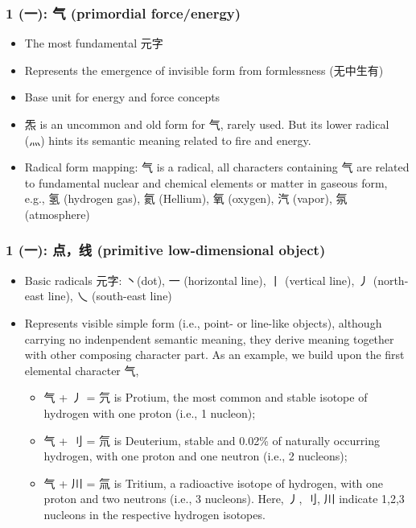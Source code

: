 \documentclass[11pt,letterpaper]{article}
\begin{document}
\subsubsection{1 (一): 气 (primordial force/energy)} 

  \begin{itemize}
  \tightlist
  \item
    The most fundamental 元字
  \item
    Represents the emergence of invisible form from formlessness
    (无中生有)
  \item
    Base unit for energy and force concepts
  \item
    炁 is an uncommon and old form for 气, rarely used. But its lower
    radical (灬) hints its semantic meaning related to fire and energy.
  \item
    Radical form mapping: 气 is a radical, all characters containing 气
    are related to fundamental nuclear and chemical elements or matter
    in gaseous form, e.g., 氢 (hydrogen gas), 氦 (Hellium), 氧 (oxygen),
    汽 (vapor), 氛 (atmosphere)
  \end{itemize}

\subsubsection{1 (一): 点，线 (primitive low-dimensional object)} 
  

  \begin{itemize}
  \tightlist
  \item
    Basic radicals 元字: 丶(dot), 一 (horizontal line), 丨 (vertical
    line), 丿 (north-east line), 乀 (south-east line)
  \item
    Represents visible simple form (i.e., point- or line-like objects),
    although carrying no indenpendent semantic meaning, they derive
    meaning together with other composing character part. As an example,
    we build upon the first elemental character 气,

    \begin{itemize}
    \tightlist
    \item
      气 + 丿 = 氕 is Protium, the most common and stable isotope of
      hydrogen with one proton (i.e., 1 nucleon);
    \item
      气 + 刂 = 氘 is Deuterium, stable and 0.02\% of naturally
      occurring hydrogen, with one proton and one neutron (i.e., 2
      nucleons);
    \item
      气 + 川 = 氚 is Tritium, a radioactive isotope of hydrogen, with
      one proton and two neutrons (i.e., 3 nucleons). Here, 丿, 刂, 川
      indicate 1,2,3 nucleons in the respective hydrogen isotopes.
    \end{itemize}
  \end{itemize}
\end{document}
